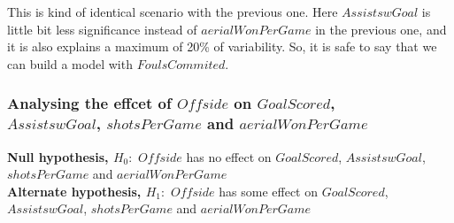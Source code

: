 \documentclass[12pt]{article}
\begin{document}
This is kind of identical scenario with the previous one. Here $ AssistswGoal $ is little bit less significance instead of $ aerialWonPerGame $ in the previous one, and it is also explains a maximum of 20\% of variability. So, it is safe to say that we can build a model with $ FoulsCommited $.

\newpage

\subsubsection{Analysing the effcet of $ Offside $ on $ GoalScored $, \\ $ AssistswGoal $, $ shotsPerGame $ and $ aerialWonPerGame $}

\textbf{Null hypothesis, $ H_0: $} $ Offside $ has no effect on $ GoalScored $, $ AssistswGoal $, $ shotsPerGame $ and $ aerialWonPerGame $\\
\textbf{Alternate hypothesis, $ H_1: $} $ Offside $ has some effect on $ GoalScored $, $ AssistswGoal $, $ shotsPerGame $ and $ aerialWonPerGame $
\end{document}
